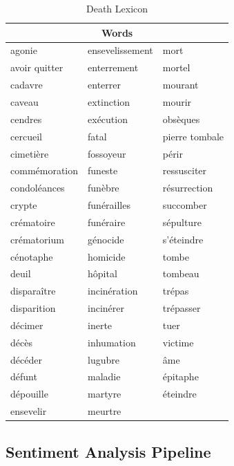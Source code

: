 \begin{table}[H]
\centering
\begin{tabular}{@{}lll@{}}
\toprule
\multicolumn{3}{c}{\textbf{Words}}               \\ \midrule
agonie        & ensevelissement & mort           \\
avoir quitter & enterrement     & mortel         \\
cadavre       & enterrer        & mourant        \\
caveau        & extinction      & mourir         \\
cendres       & exécution       & obsèques       \\
cercueil      & fatal           & pierre tombale \\
cimetière     & fossoyeur       & périr          \\
commémoration & funeste         & ressusciter    \\
condoléances  & funèbre         & résurrection   \\
crypte        & funérailles     & succomber      \\
crématoire    & funéraire       & sépulture      \\
crématorium   & génocide        & s’éteindre     \\
cénotaphe     & homicide        & tombe          \\
deuil         & hôpital         & tombeau        \\
disparaître   & incinération    & trépas         \\
disparition   & incinérer       & trépasser      \\
décimer       & inerte          & tuer           \\
décès         & inhumation      & victime        \\
décéder       & lugubre         & âme            \\
défunt        & maladie         & épitaphe       \\
dépouille     & martyre         & éteindre       \\
ensevelir     & meurtre         &                \\ \bottomrule
\end{tabular}
\caption{Death Lexicon}
\label{tab:death lexicon}
\end{table}
\subsection{Sentiment Analysis Pipeline}

